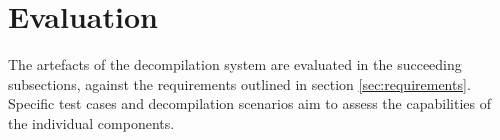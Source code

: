 
%

%
%

\section{Evaluation}
\label{sec:evaluation}

The artefacts of the decompilation system are evaluated in the succeeding subsections, against the requirements outlined in section \ref{sec:requirements}. Specific test cases and decompilation scenarios aim to assess the capabilities of the individual components.






